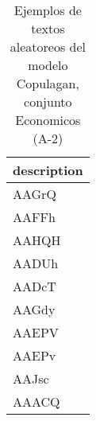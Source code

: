 \begin{table}[H]
\centering
\fontsize{8}{14}\selectfont
\caption{Ejemplos de textos aleatoreos del modelo Copulagan, conjunto Economicos (A-2)}
\label{table-sample10-economicos-a-2-copulagan-text}
\begin{tabular}{|m{50em}|}
\hline
\rowcolor[gray]{0.8}
description \\
\hline AAGrQ \\
\hline AAFFh \\
\hline AAHQH \\
\hline AADUh \\
\hline AADcT \\
\hline AAGdy \\
\hline AAEPV \\
\hline AAEPv \\
\hline AAJsc \\
\hline AAACQ \\
\hline
\end{tabular}
\end{table}

